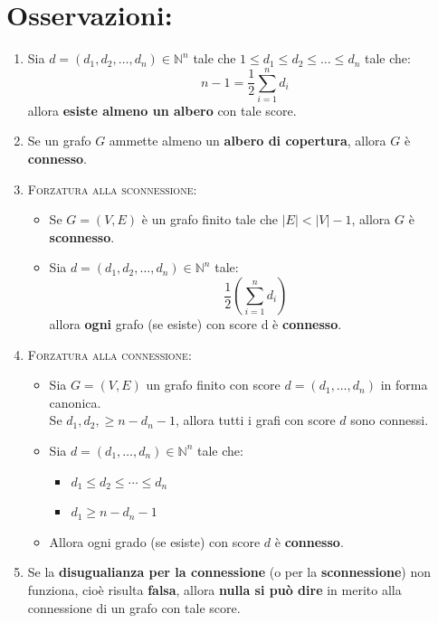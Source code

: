 \documentclass[10pt]{article}
\begin{document}
	
	\section{Osservazioni:}
	\begin{enumerate}
	\item
	Sia $d = (d_1,d_2,\dotso,d_n) \in \mathbb{N}^n$ tale che $1\leq d_1 \leq d_2 \leq \dotso \leq d_n$ tale che:$$\displaystyle{n-1 = \frac{1}{2} \sum_{i=1}^{n} d_i}$$ allora \textbf{esiste almeno un albero} con tale score.
	\item
	Se un grafo $G$ ammette almeno un \textbf{albero di copertura}, allora $G$ è \textbf{connesso}.
	\item
	\textsc{Forzatura alla sconnessione}:
	\begin{itemize}
	\item
	 Se $G=(V,E)$ è un grafo finito tale che $|E| < |V| - 1$, allora $G$ è \textbf{sconnesso}.
	 \item
	 Sia $d = (d_1, d_2, \dotso, d_n) \in \mathbb{N}^n$ tale:
	 $$\displaystyle{\frac{1}{2}\left(\sum_{i=1}^{n} d_i \right)}$$
	 allora \textbf{ogni} grafo (se esiste) con score d è \textbf{connesso}.
	\end{itemize}
	\item
	\textsc{Forzatura alla connessione}:
	\begin{itemize}
	\item
	Sia $G=(V,E)$ un grafo finito con score $d=(d_1, \dotso, d_n)$ in forma canonica.\\ Se $d_1, d_2, \geq n - d_n - 1$, allora tutti i grafi con score $d$ sono connessi.
	\item
	Sia $d=(d_1, \dotso, d_n) \in \mathbb{N}^n$ tale che:
	\begin{itemize}
	\item
	$d_1 \leq d_2 \leq \dotsb \leq d_n$
	\item
	$d_1 \geq n - d_n - 1$
	\end{itemize}
	\item
	Allora ogni grado (se esiste) con score $d$ è \textbf{connesso}.
	\end{itemize}
	\item
	Se la \textbf{disugualianza per la connessione} (o per la \textbf{sconnessione}) non funziona, cioè risulta \textbf{falsa}, allora \textbf{nulla si può dire} in merito alla connessione di un grafo con tale score.
	\end{enumerate}
	
	\newpage
	
\end{document}
